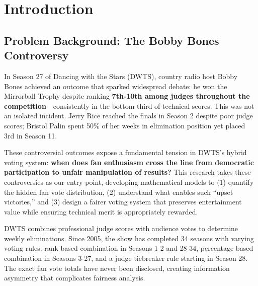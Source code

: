 \documentclass{mcmthesis}
\begin{document}
\maketitle

\setcounter{page}{2}
\nopagebreak %
\vspace{-2.5cm} 

\tableofcontents
\newpage

\section{Introduction}

\subsection{Problem Background: The Bobby Bones Controversy}

In Season 27 of Dancing with the Stars (DWTS), country radio host Bobby Bones achieved an outcome that sparked widespread debate: he won the Mirrorball Trophy despite ranking \textbf{7th-10th among judges throughout the competition}---consistently in the bottom third of technical scores. This was not an isolated incident. Jerry Rice reached the finals in Season 2 despite poor judge scores; Bristol Palin spent 50\% of her weeks in elimination position yet placed 3rd in Season 11.

These controversial outcomes expose a fundamental tension in DWTS's hybrid voting system: \textbf{when does fan enthusiasm cross the line from democratic participation to unfair manipulation of results?} This research takes these controversies as our entry point, developing mathematical models to (1) quantify the hidden fan vote distribution, (2) understand what enables such ``upset victories,'' and (3) design a fairer voting system that preserves entertainment value while ensuring technical merit is appropriately rewarded.

DWTS combines professional judge scores with audience votes to determine weekly eliminations. Since 2005, the show has completed 34 seasons with varying voting rules: rank-based combination in Seasons 1-2 and 28-34, percentage-based combination in Seasons 3-27, and a judge tiebreaker rule starting in Season 28. The exact fan vote totals have never been disclosed, creating information asymmetry that complicates fairness analysis.
\end{document}
